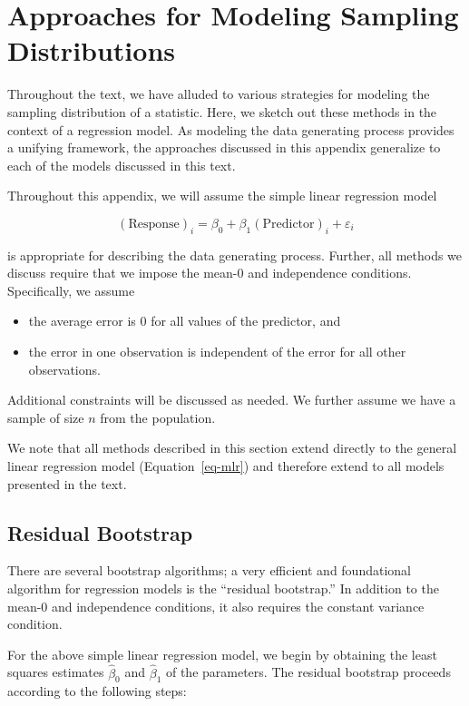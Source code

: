 \documentclass[
  letterpaper,
  DIV=11,
  numbers=noendperiod]{scrreprt}
\providecommand{\tightlist}{%
  \setlength{\itemsep}{0pt}\setlength{\parskip}{0pt}}\usepackage{longtable,booktabs,array}
\theoremstyle{definition}
\theoremstyle{definition}
\theoremstyle{plain}
\theoremstyle{remark}
\begin{document}
\cleardoublepage
{}
{}
\appendix

\chapter{Approaches for Modeling Sampling
Distributions}\label{sec-app-theory}

Throughout the text, we have alluded to various strategies for modeling
the sampling distribution of a statistic. Here, we sketch out these
methods in the context of a regression model. As modeling the data
generating process provides a unifying framework, the approaches
discussed in this appendix generalize to each of the models discussed in
this text.

Throughout this appendix, we will assume the simple linear regression
model

\[(\text{Response})_i = \beta_0 + \beta_1 (\text{Predictor})_i + \varepsilon_i\]

is appropriate for describing the data generating process. Further, all
methods we discuss require that we impose the mean-0 and independence
conditions. Specifically, we assume

\begin{itemize}
\tightlist
\item
  the average error is 0 for all values of the predictor, and
\item
  the error in one observation is independent of the error for all other
  observations.
\end{itemize}

Additional constraints will be discussed as needed. We further assume we
have a sample of size \(n\) from the population.

We note that all methods described in this section extend directly to
the general linear regression model (Equation~\ref{eq-mlr}) and
therefore extend to all models presented in the text.

\section{Residual Bootstrap}\label{residual-bootstrap}

There are several bootstrap algorithms; a very efficient and
foundational algorithm for regression models is the ``residual
bootstrap.'' In addition to the mean-0 and independence conditions, it
also requires the constant variance condition.

For the above simple linear regression model, we begin by obtaining the
least squares estimates \(\widehat{\beta}_0\) and \(\widehat{\beta}_1\)
of the parameters. The residual bootstrap proceeds according to the
following steps:
\end{document}
